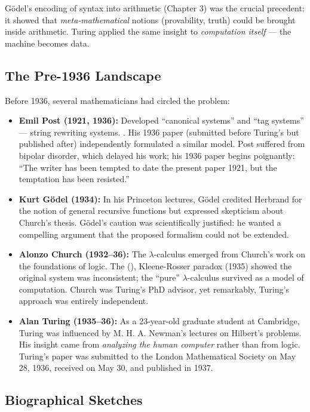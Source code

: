 G\"odel's encoding of syntax into arithmetic (Chapter 3) was the crucial precedent: it showed that \emph{meta-mathematical} notions (provability, truth) could be brought inside arithmetic. Turing applied the same insight to \emph{computation itself} --- the machine becomes data.

\subsection*{The Pre-1936 Landscape}

Before 1936, several mathematicians had circled the problem:
\begin{itemize}
\item \textbf{Emil Post (1921, 1936):} Developed ``canonical systems'' and ``tag systems'' --- string rewriting systems. \cite{church1936}. His 1936 paper (submitted before Turing's but published after) independently formulated a similar model. Post suffered from bipolar disorder, which delayed his work; his 1936 paper begins poignantly: ``The writer has been tempted to date the present paper 1921, but the temptation has been resisted.''

\item \textbf{Kurt G\"odel (1934):} In his Princeton lectures, G\"odel credited Herbrand for the notion of general recursive functions but expressed skepticism about Church's thesis. G\"odel's caution was scientifically justified: he wanted a compelling argument that the proposed formalism could not be extended.

\item \textbf{Alonzo Church (1932--36):} The $\lambda$-calculus emerged from Church's work on the foundations of logic. The (\cite{kleenerosser1935}), Kleene-Rosser paradox (1935) showed the original system was inconsistent; the ``pure'' $\lambda$-calculus survived as a model of computation. Church was Turing's PhD advisor, yet remarkably, Turing's approach was entirely independent.

\item \textbf{Alan Turing (1935--36):} As a 23-year-old graduate student at Cambridge, Turing was influenced by M. H. A. Newman's lectures on Hilbert's problems. His insight came from \emph{analyzing the human computer} rather than from logic. Turing's paper was submitted to the London Mathematical Society on May 28, 1936, received on May 30, and published in 1937.
\end{itemize}

\subsection*{Biographical Sketches}

